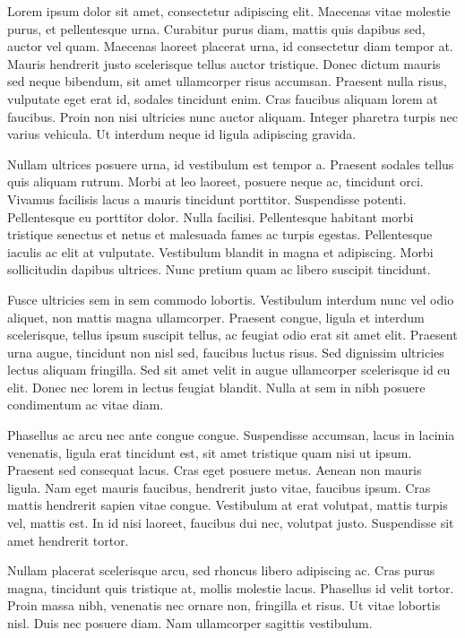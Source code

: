 Lorem ipsum dolor sit amet, consectetur adipiscing elit. Maecenas vitae molestie purus, et pellentesque urna. Curabitur purus diam, mattis quis dapibus sed, auctor vel quam. Maecenas laoreet placerat urna, id consectetur diam tempor at. Mauris hendrerit justo scelerisque tellus auctor tristique. Donec dictum mauris sed neque bibendum, sit amet ullamcorper risus accumsan. Praesent nulla risus, vulputate eget erat id, sodales tincidunt enim. Cras faucibus aliquam lorem at faucibus. Proin non nisi ultricies nunc auctor aliquam. Integer pharetra turpis nec varius vehicula. Ut interdum neque id ligula adipiscing gravida.

Nullam ultrices posuere urna, id vestibulum est tempor a. Praesent sodales tellus quis aliquam rutrum. Morbi at leo laoreet, posuere neque ac, tincidunt orci. Vivamus facilisis lacus a mauris tincidunt porttitor. Suspendisse potenti. Pellentesque eu porttitor dolor. Nulla facilisi. Pellentesque habitant morbi tristique senectus et netus et malesuada fames ac turpis egestas. Pellentesque iaculis ac elit at vulputate. Vestibulum blandit in magna et adipiscing. Morbi sollicitudin dapibus ultrices. Nunc pretium quam ac libero suscipit tincidunt.

Fusce ultricies sem in sem commodo lobortis. Vestibulum interdum nunc vel odio aliquet, non mattis magna ullamcorper. Praesent congue, ligula et interdum scelerisque, tellus ipsum suscipit tellus, ac feugiat odio erat sit amet elit. Praesent urna augue, tincidunt non nisl sed, faucibus luctus risus. Sed dignissim ultricies lectus aliquam fringilla. Sed sit amet velit in augue ullamcorper scelerisque id eu elit. Donec nec lorem in lectus feugiat blandit. Nulla at sem in nibh posuere condimentum ac vitae diam.

Phasellus ac arcu nec ante congue congue. Suspendisse accumsan, lacus in lacinia venenatis, ligula erat tincidunt est, sit amet tristique quam nisi ut ipsum. Praesent sed consequat lacus. Cras eget posuere metus. Aenean non mauris ligula. Nam eget mauris faucibus, hendrerit justo vitae, faucibus ipsum. Cras mattis hendrerit sapien vitae congue. Vestibulum at erat volutpat, mattis turpis vel, mattis est. In id nisi laoreet, faucibus dui nec, volutpat justo. Suspendisse sit amet hendrerit tortor.

Nullam placerat scelerisque arcu, sed rhoncus libero adipiscing ac. Cras purus magna, tincidunt quis tristique at, mollis molestie lacus. Phasellus id velit tortor. Proin massa nibh, venenatis nec ornare non, fringilla et risus. Ut vitae lobortis nisl. Duis nec posuere diam. Nam ullamcorper sagittis vestibulum. 